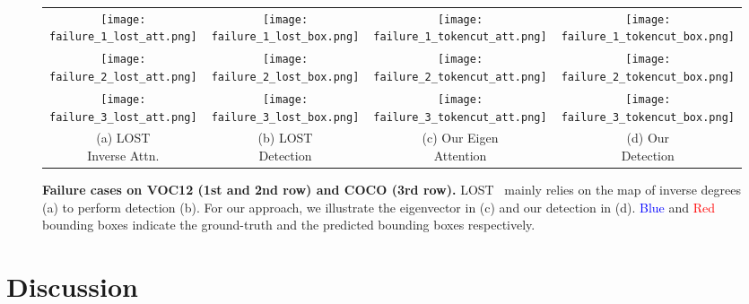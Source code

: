 \documentclass[twocolumn]{article}
\begin{document}
\begin{figure}[ht!]
\centering
\begin{tabular}{c@{\hskip 3pt}c@{\hskip 3pt}c@{\hskip 3pt}c}

        \texttt{[image: failure\_1\_lost\_att.png]} &
		\texttt{[image: failure\_1\_lost\_box.png]} &
		\texttt{[image: failure\_1\_tokencut\_att.png]} &
		\texttt{[image: failure\_1\_tokencut\_box.png]}\\	
		
		\texttt{[image: failure\_2\_lost\_att.png]} &
		\texttt{[image: failure\_2\_lost\_box.png]} &
		\texttt{[image: failure\_2\_tokencut\_att.png]} &
		\texttt{[image: failure\_2\_tokencut\_box.png]}\\
		
		\texttt{[image: failure\_3\_lost\_att.png]} &
		\texttt{[image: failure\_3\_lost\_box.png]} &
		\texttt{[image: failure\_3\_tokencut\_att.png]} &
		\texttt{[image: failure\_3\_tokencut\_box.png]}\\
        \makecell{(a) LOST \\ Inverse Attn.} & \makecell{(b) LOST \\Detection} & \makecell{(c) Our Eigen \\ Attention} & \makecell{(d) Our \\Detection} \\ 
\end{tabular}

\caption{\textbf{Failure cases on VOC12 (1st and 2nd row) and COCO (3rd row).} LOST~\cite{simeoni2021localizing}  mainly relies on the map of inverse degrees (a) to perform detection (b). For our approach, we illustrate the eigenvector in (c) and our detection in (d). \textcolor{blue}{Blue} and \textcolor{red}{Red} bounding boxes indicate the ground-truth and the predicted bounding boxes respectively.}
\label{fig:failure}
\end{figure}

\section{Discussion}
\end{document}

